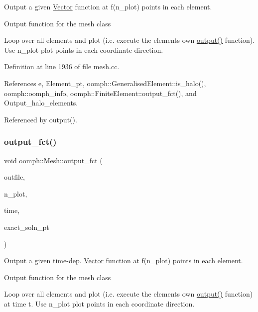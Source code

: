 Output a given \hyperlink{classoomph_1_1Vector}{Vector} function at f(n\+\_\+plot) points in each element. 

Output function for the mesh class

Loop over all elements and plot (i.\+e. execute the element\textquotesingle{}s own \hyperlink{classoomph_1_1Mesh_aab74388e8e21325f3ca26f1bd99c26f7}{output()} function). Use n\+\_\+plot plot points in each coordinate direction. 

Definition at line 1936 of file mesh.\+cc.



References e, Element\+\_\+pt, oomph\+::\+Generalised\+Element\+::is\+\_\+halo(), oomph\+::oomph\+\_\+info, oomph\+::\+Finite\+Element\+::output\+\_\+fct(), and Output\+\_\+halo\+\_\+elements.



Referenced by output().

\mbox{\label{classoomph_1_1Mesh_a56d3007b3d8a11c8f5852bcfcc1d195d}} 
\subsubsection{\texorpdfstring{output\+\_\+fct()}{output\_fct()}\hspace{0.1cm}{\footnotesize\ttfamily [2/2]}}
{\footnotesize\ttfamily void oomph\+::\+Mesh\+::output\+\_\+fct (\begin{DoxyParamCaption}\item[{std\+::ostream \&}]{outfile,  }\item[{const unsigned \&}]{n\+\_\+plot,  }\item[{const double \&}]{time,  }\item[{\hyperlink{classoomph_1_1FiniteElement_ad4ecf2b61b158a4b4d351a60d23c633e}{Finite\+Element\+::\+Unsteady\+Exact\+Solution\+Fct\+Pt}}]{exact\+\_\+soln\+\_\+pt }\end{DoxyParamCaption})}



Output a given time-\/dep. \hyperlink{classoomph_1_1Vector}{Vector} function at f(n\+\_\+plot) points in each element. 

Output function for the mesh class

Loop over all elements and plot (i.\+e. execute the element\textquotesingle{}s own \hyperlink{classoomph_1_1Mesh_aab74388e8e21325f3ca26f1bd99c26f7}{output()} function) at time t. Use n\+\_\+plot plot points in each coordinate direction. 

